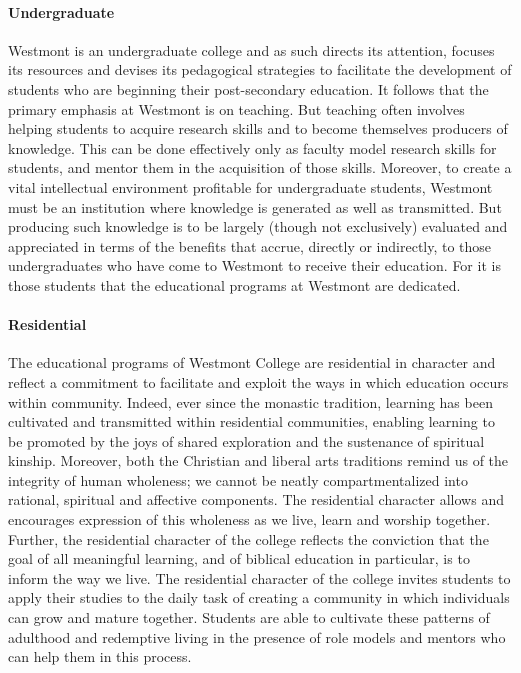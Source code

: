 			\paragraph{Undergraduate}
				Westmont is an undergraduate college and as such directs its attention, focuses its resources and devises
				its pedagogical strategies to facilitate the development of students who are beginning their post-secondary
				education.  It follows that the primary emphasis at Westmont is on teaching.  But teaching often involves
				helping students to acquire research skills and to become themselves producers of knowledge.  This can be
				done effectively only as faculty model research skills for students, and mentor them in the acquisition of
				those skills.  Moreover, to create a vital intellectual environment profitable for undergraduate students,
				Westmont must be an institution where knowledge is generated as well as transmitted.  But producing such
				knowledge is to be largely (though not exclusively) evaluated and appreciated in terms of the benefits that
				accrue, directly or indirectly, to those undergraduates who have come to Westmont to receive their
				education. For it is those students that the educational programs at Westmont are dedicated.
			\paragraph{Residential}
				The educational programs of Westmont College are residential in character and reflect a commitment to
				facilitate and exploit the ways in which education occurs within community.  Indeed, ever since the monastic
				tradition, learning has been cultivated and transmitted within residential communities, enabling learning to
				be promoted by the joys of shared exploration and the sustenance of spiritual kinship.  Moreover, both the
				Christian and liberal arts traditions remind us of the integrity of human wholeness; we cannot be neatly
				compartmentalized into rational, spiritual and affective components.  The residential character allows and
				encourages expression of this wholeness as we live, learn and worship together.  Further, the residential
				character of the college reflects the conviction that the goal of all meaningful learning, and of biblical
				education in particular, is to inform the way we live.  The residential character of the college invites
				students to apply their studies to the daily task of creating a community in which individuals can grow and
				mature together.  Students are able to cultivate these patterns of adulthood and redemptive living in the
				presence of role models and mentors who can help them in this process.
